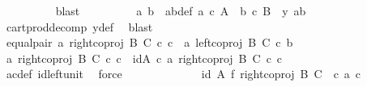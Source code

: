 \begin{isabellebody}
\ \ \ \ \ \ \ \ \isamarkupfalse%
\ blast\isanewline
\ \ \ \ \ \ \isamarkupfalse%
\ \isamarkupfalse%
\ a{\isacharprime}{\kern0pt}\ b{\isacharprime}{\kern0pt}\ \ a{\isacharprime}{\kern0pt}b{\isacharprime}{\kern0pt}{\isacharunderscore}{\kern0pt}def{\isacharcolon}{\kern0pt}\ {\isachardoublequoteopen}a{\isacharprime}{\kern0pt}\ {\isasymin}\isactrlsub c\ A\ {\isasymand}\ b{\isacharprime}{\kern0pt}\ {\isasymin}\isactrlsub c\ B\ {\isasymand}\ y{\isacharprime}{\kern0pt}\ {\isacharequal}{\kern0pt}{\isasymlangle}a{\isacharprime}{\kern0pt}{\isacharcomma}{\kern0pt}b{\isacharprime}{\kern0pt}{\isasymrangle}{\isachardoublequoteclose}\isanewline
\ \ \ \ \ \ \ \ \isamarkupfalse%
\ cart{\isacharunderscore}{\kern0pt}prod{\isacharunderscore}{\kern0pt}decomp\ y{\isacharprime}{\kern0pt}{\isacharunderscore}{\kern0pt}def\ \isamarkupfalse%
\ blast\isanewline
\ \ \ \ \ \ \isamarkupfalse%
\ equal{\isacharunderscore}{\kern0pt}pair{\isacharcolon}{\kern0pt}\ {\isachardoublequoteopen}{\isasymlangle}a{\isacharcomma}{\kern0pt}\ right{\isacharunderscore}{\kern0pt}coproj\ B\ C\ {\isasymcirc}\isactrlsub c\ c{\isasymrangle}\ {\isacharequal}{\kern0pt}\ {\isasymlangle}a{\isacharprime}{\kern0pt}{\isacharcomma}{\kern0pt}\ left{\isacharunderscore}{\kern0pt}coproj\ B\ C\ {\isasymcirc}\isactrlsub c\ b{\isacharprime}{\kern0pt}{\isasymrangle}{\isachardoublequoteclose}\isanewline
\ \ \ \ \ \ \isamarkupfalse%
\ {\isacharminus}{\kern0pt}\ \isanewline
\ \ \ \ \ \ \ \ \isamarkupfalse%
\ {\isachardoublequoteopen}{\isasymlangle}a{\isacharcomma}{\kern0pt}\ right{\isacharunderscore}{\kern0pt}coproj\ B\ C\ {\isasymcirc}\isactrlsub c\ c{\isasymrangle}\ {\isacharequal}{\kern0pt}\ {\isasymlangle}id{\isacharparenleft}{\kern0pt}A{\isacharparenright}{\kern0pt}\ {\isasymcirc}\isactrlsub c\ a{\isacharcomma}{\kern0pt}\ right{\isacharunderscore}{\kern0pt}coproj\ B\ C\ {\isasymcirc}\isactrlsub c\ c{\isasymrangle}{\isachardoublequoteclose}\isanewline
\ \ \ \ \ \ \ \ \ \ \isamarkupfalse%
\ ac{\isacharunderscore}{\kern0pt}def\ id{\isacharunderscore}{\kern0pt}left{\isacharunderscore}{\kern0pt}unit{}\ \isamarkupfalse%
\ force\isanewline
\ \ \ \ \ \ \ \ \isamarkupfalse%
\ \isamarkupfalse%
\ {\isachardoublequoteopen}{\isachardot}{\kern0pt}{\isachardot}{\kern0pt}{\isachardot}{\kern0pt}\ {\isacharequal}{\kern0pt}\ {\isacharparenleft}{\kern0pt}id\ A\ {\isasymtimes}\isactrlsub f\ right{\isacharunderscore}{\kern0pt}coproj\ B\ C{\isacharparenright}{\kern0pt}\ \ {\isasymcirc}\isactrlsub c\ {\isasymlangle}a{\isacharcomma}{\kern0pt}\ c{\isasymrangle}{\isachardoublequoteclose}\isanewline

\end{isabellebody}
